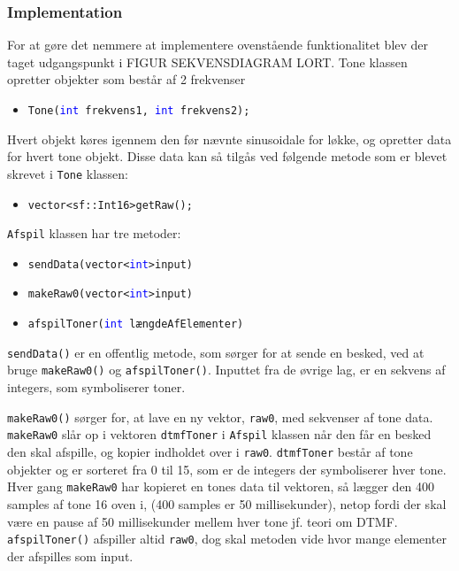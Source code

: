 \subsubsection{Implementation}
For at gøre det nemmere at implementere ovenstående funktionalitet blev der taget udgangspunkt i FIGUR SEKVENSDIAGRAM LORT. 
\newline
Tone klassen opretter objekter som består af 2 frekvenser
\begin{itemize}
	\item \texttt{Tone(\textcolor{blue}{int} frekvens1, \textcolor{blue}{int} frekvens2);}
\end{itemize}
Hvert objekt køres igennem den før nævnte sinusoidale for løkke, og opretter data for hvert tone objekt. Disse data kan så tilgås ved følgende metode som er blevet skrevet i \texttt{Tone} klassen:
\begin{itemize}
	\item \texttt{\textcolor{dkgreen}{vector}<sf::\textcolor{dkgreen}{Int16}>getRaw();}
\end{itemize}
\hfill \break
\texttt{Afspil} klassen har tre metoder:
\begin{itemize}
	\item \texttt{sendData({\textcolor{dkgreen}{vector}}<\textcolor{blue}{int}>input)}
	
	\item \texttt{makeRaw0(\textcolor{dkgreen}{vector}<\textcolor{blue}{int}>input)}
	
	\item \texttt{afspilToner(\textcolor{blue}{int} længdeAfElementer)}
\end{itemize}
\texttt{sendData()} er en offentlig metode, som sørger for at sende en besked, ved at bruge \texttt{makeRaw0()} og \texttt{afspilToner()}. Inputtet fra de øvrige lag, er en sekvens af integers, som symboliserer toner. 
\hfill \break

\texttt{makeRaw0()} sørger for, at lave en ny vektor, \texttt{\textcolor{dkgreen}{raw0}}, med sekvenser af tone data. \texttt{makeRaw0} slår op i vektoren \texttt{\textcolor{dkgreen}{dtmfToner}} i \texttt{Afspil} klassen når den får en besked den skal afspille, og kopier indholdet over i \texttt{\textcolor{dkgreen}{raw0}}. \texttt{\textcolor{dkgreen}{dtmfToner}} består af tone objekter og er sorteret fra 0 til 15, som er de integers der symboliserer hver tone. Hver gang \texttt{makeRaw0} har kopieret en tones data til vektoren, så lægger den 400 samples af tone 16 oven i, (400 samples er 50 millisekunder), netop fordi der skal være en pause af 50 millisekunder mellem hver tone jf. teori om DTMF.
\newline
\texttt{afspilToner()} afspiller altid \texttt{\textcolor{dkgreen}{raw0}}, dog skal metoden vide hvor mange elementer der afspilles som input.
\hfill \break

